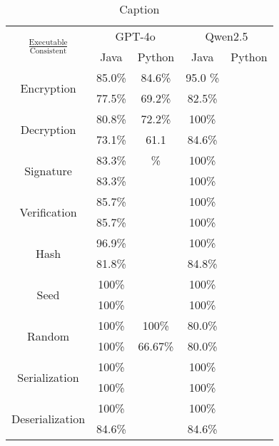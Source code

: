 \begin{table}[ht]
    \centering
    \caption{Caption}
    \begin{tabular}{c|cc|cc}
    \toprule[1.5pt]
     \multirow{2}{*}{$\frac{\text{Executable}}{\text{Consistent}}$} &  \multicolumn{2}{c|}{GPT-4o} & \multicolumn{2}{c}{Qwen2.5} \\
       &  Java  & Python &  Java  & Python \\
     \midrule[0.8pt]
    \multirow{2}{*}{Encryption} & 85.0\% & 84.6\% & 95.0 \%&   \\
    & 77.5\% & 69.2\% & 82.5\% &  \\
    \midrule[0.8pt]
      \multirow{2}{*}{Decryption} & 80.8\% & 72.2\% & 100\% &  \\
    & 73.1\%  & 61.1& 84.6\% &  \\
    \midrule[0.8pt]
     \multirow{2}{*}{Signature} & 83.3\% & \% & 100\% &  \\
    & 83.3\%  &  & 100\% &   \\
    \midrule[0.8pt]
     \multirow{2}{*}{Verification} & 85.7\% &  &  100\%&  \\
    & 85.7\% & & 100\% &   \\
    \midrule[0.8pt]
     \multirow{2}{*}{Hash} & 96.9\% & &  100\%&  \\
    & 81.8\% & & 84.8\% &  \\
    \midrule[0.8pt]
     \multirow{2}{*}{Seed} & 100\%&  &  100\%&  \\
    & 100\% & & 100\% &  \\
    \midrule[0.8pt]
     \multirow{2}{*}{Random} & 100\%& 100\%  & 80.0\% &  \\
    & 100\%& 66.67\% & 80.0\% &   \\
    \midrule[0.8pt]
     \multirow{2}{*}{Serialization} & 100\% & &  100\%&  \\
    & 100\% & & 100\% &  \\
    \midrule[0.8pt]
     \multirow{2}{*}{Deserialization} & 100\%&  &  100\%&  \\
    & 84.6\%& & 84.6\% &  \\
     
    \bottomrule[1.5pt]
    \end{tabular}
    \label{tab:eva:type}
\end{table}

